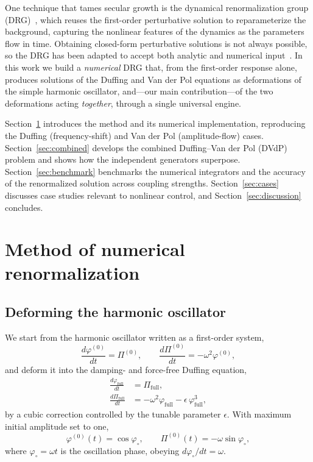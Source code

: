 \documentclass[aps,pre,twocolumn,showpacks,nofootinbib,superscriptaddress]{revtex4-2}
\newcommand{\dd}[2]{\frac{d #1}{d #2}}
\newcommand{\phifull}{\varphi_{\mathrm{full}}}
\newcommand{\Pifull}{\Pi_{\mathrm{full}}}
\begin{document}
One technique that tames secular growth is the dynamical renormalization group
(DRG)~\cite{chen1994,chen1996}, which reuses the first-order perturbative
solution to reparameterize the background, capturing the nonlinear features of
the dynamics as the parameters flow in time. Obtaining closed-form perturbative
solutions is not always possible, so the DRG has been adapted to accept both
analytic and numerical input~\cite{galvez2021}. In this work we build a
\emph{numerical} DRG that, from the first-order response alone, produces
solutions of the Duffing and Van der Pol equations as deformations of the simple
harmonic oscillator, and---our main contribution---of the two deformations
acting \emph{together}, through a single universal engine.

Section~\ref{sec:method} introduces the method and its numerical
implementation, reproducing the Duffing (frequency-shift) and Van der Pol
(amplitude-flow) cases. Section~\ref{sec:combined} develops the combined
Duffing--Van der Pol (DVdP) problem and shows how the independent generators
superpose. Section~\ref{sec:benchmark} benchmarks the numerical integrators and
the accuracy of the renormalized solution across coupling strengths.
Section~\ref{sec:cases} discusses case studies relevant to nonlinear control,
and Section~\ref{sec:discussion} concludes.

\section{Method of numerical renormalization}
\label{sec:method}

\subsection{Deforming the harmonic oscillator}
\label{sec:duffing}

We start from the harmonic oscillator written as a first-order system,
\begin{equation}
  \dd{\varphi^{(0)}}{t}=\Pi^{(0)}, \qquad
  \dd{\Pi^{(0)}}{t}=-\omega^2\varphi^{(0)},
  \label{eq:sho}
\end{equation}
and deform it into the damping- and force-free Duffing equation,
\begin{subequations}
\begin{align}
  \dd{\phifull}{t}&=\Pifull,\\
  \dd{\Pifull}{t}&=-\omega^2\phifull-\epsilon\,\phifull^3,
  \label{eq:duffing}
\end{align}
\end{subequations}
by a cubic correction controlled by the tunable parameter $\epsilon$. With
maximum initial amplitude set to one,
\begin{equation}
  \varphi^{(0)}(t)=\cos\varphi_\circ,\qquad
  \Pi^{(0)}(t)=-\omega\sin\varphi_\circ,
  \label{eq:background1}
\end{equation}
where $\varphi_\circ=\omega t$ is the oscillation phase, obeying
$d\varphi_\circ/dt=\omega$.
\end{document}
